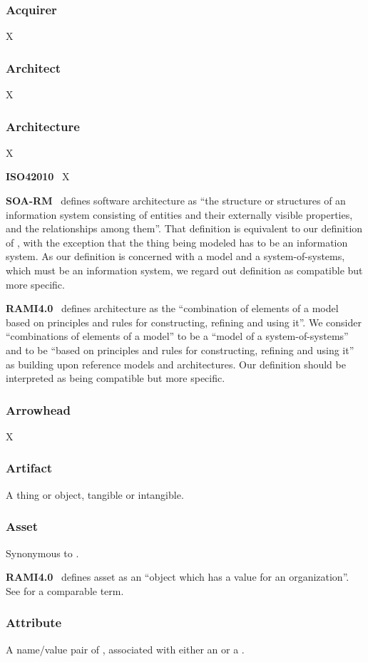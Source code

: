 {

\newcommand{\GlossaryEntry}[3][]{\subsubsection*{#3\IfStrEq{#1}{}{}{ {\normalfont \textit{#1}}}}\label{sec:glossary:#2}}
\newcommand{\GlossaryNote}[2]{\begin{minipage}[b]{\dimexpr\linewidth-0.5cm\relax}\vspace*{0.33cm}\footnotesize{\textbf{#1}\ #2}\end{minipage}}

\GlossaryEntry{acquirer}{Acquirer}
X

\GlossaryEntry{architect}{Architect}
X

\GlossaryEntry{architecture}{Architecture}
X

	\GlossaryNote{ISO42010}{
		X
	}

	\GlossaryNote{SOA-RM}{
		defines software architecture as ``the structure or structures of an information system consisting of entities and their externally visible properties, and the relationships among them''.
		That definition is equivalent to our definition of \GlossaryHyperRef{model}{model}, with the exception that the thing being modeled has to be an information system.
		As our definition is concerned with a model and a system-of-systems, which must be an information system, we regard out definition as compatible but more specific.
	}

	\GlossaryNote{RAMI4.0}{
		defines architecture as the ``combination of elements of a model based on principles and rules for constructing, refining and using it''.
		We consider ``combinations of elements of a model'' to be a ``model of a system-of-systems'' and to be ``based on principles and rules for constructing, refining and using it'' as building upon reference models and architectures.
		Our definition should be interpreted as being compatible but more specific.
	}


\GlossaryEntry{arrowhead}{Arrowhead}
X

\GlossaryEntry{artifact}{Artifact}
A thing or object, tangible or intangible.

\GlossaryEntry{asset}{Asset}
Synonymous to .

	\GlossaryNote{RAMI4.0}{
		defines asset as an ``object which has a value for an organization''.
		See \GlossaryNameRef{resource} for a comparable term.
	}

\GlossaryEntry{attribute}{Attribute}
A name/value pair of , associated with either an  or a .

}
